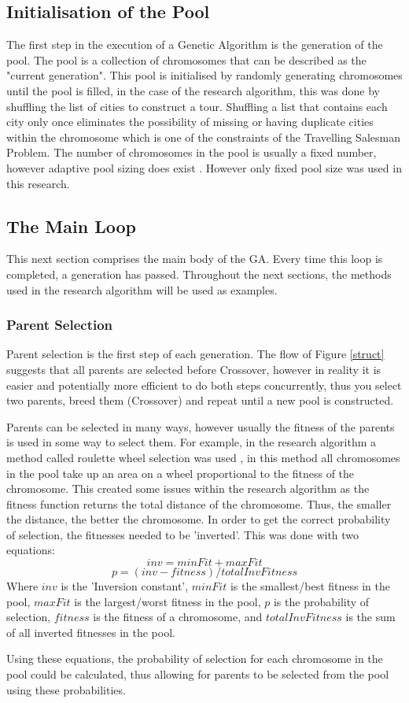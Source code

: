 \subsection{Initialisation of the Pool}
\par
The first step in the execution of a Genetic Algorithm is the generation of the pool. The pool is a collection of chromosomes that can be described as the "current generation". This pool is initialised by randomly generating chromosomes until the pool is filled, in the case of the research algorithm, this was done by shuffling the list of cities to construct a tour. Shuffling a list that contains each city only once eliminates the possibility of missing or having duplicate cities within the chromosome which is one of the constraints of the Travelling Salesman Problem. The number of chromosomes in the pool is usually a fixed number, however adaptive pool sizing does exist \cite{populationsize}. However only fixed pool size was used in this research. 

\subsection{The Main Loop}
\par
This next section comprises the main body of the GA. Every time this loop is completed, a generation has passed. Throughout the next sections, the methods used in the research algorithm will be used as examples.
\subsubsection{Parent Selection}\label{parents}
\par
Parent selection is the first step of each generation. The flow of Figure \ref{struct} suggests that all parents are selected before Crossover, however in reality it is easier and potentially more efficient to do both steps concurrently, thus you select two parents, breed them (Crossover) and repeat until a new pool is constructed.
\par
Parents can be selected in many ways, however usually the fitness of the parents is used in some way to select them. For example, in the research algorithm a method called roulette wheel selection was used \cite{Slides}, in this method all chromosomes in the pool take up an area on a wheel proportional to the fitness of the chromosome. This created some issues within the research algorithm as the fitness function returns the total distance of the chromosome. Thus, the smaller the distance, the better the chromosome. In order to get the correct probability of selection, the fitnesses needed to be 'inverted'. This was done with two equations: 
\[ inv = minFit + maxFit\]
\[ p = (inv - fitness)/totalInvFitness\]
Where $inv$ is the 'Inversion constant', $minFit$ is the smallest/best fitness in the pool, $maxFit$ is the largest/worst fitness in the pool, $p$ is the probability of selection, $fitness$ is the fitness of a chromosome, and $totalInvFitness$ is the sum of all inverted fitnesses in the pool.
\par
Using these equations, the probability of selection for each chromosome in the pool could be calculated, thus allowing for parents to be selected from the pool using these probabilities.
